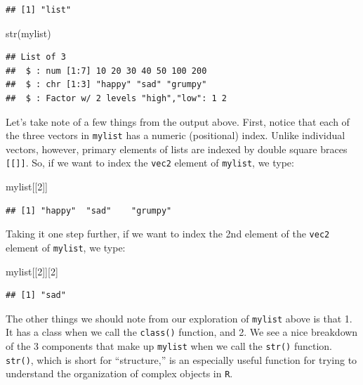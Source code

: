 \documentclass[
]{book}
\newenvironment{Shaded}{\begin{snugshade}}{\end{snugshade}}
\newcommand{\DecValTok}[1]{\textcolor[rgb]{0.00,0.00,0.81}{#1}}
\newcommand{\FunctionTok}[1]{\textcolor[rgb]{0.00,0.00,0.00}{#1}}
\newcommand{\NormalTok}[1]{#1}
\begin{document}
\begin{verbatim}
## [1] "list"
\end{verbatim}

\begin{Shaded}
\begin{Highlighting}[]
\FunctionTok{str}\NormalTok{(mylist)}
\end{Highlighting}
\end{Shaded}

\begin{verbatim}
## List of 3
##  $ : num [1:7] 10 20 30 40 50 100 200
##  $ : chr [1:3] "happy" "sad" "grumpy"
##  $ : Factor w/ 2 levels "high","low": 1 2
\end{verbatim}

Let's take note of a few things from the output above. First, notice that each of the three vectors in \texttt{mylist} has a numeric (positional) index. Unlike individual vectors, however, primary elements of lists are indexed by double square braces \texttt{{[}{[}{]}{]}}. So, if we want to index the \texttt{vec2} element of \texttt{mylist}, we type:

\begin{Shaded}
\begin{Highlighting}[]
\NormalTok{mylist[[}\DecValTok{2}\NormalTok{]]}
\end{Highlighting}
\end{Shaded}

\begin{verbatim}
## [1] "happy"  "sad"    "grumpy"
\end{verbatim}

Taking it one step further, if we want to index the 2nd element of the \texttt{vec2} element of \texttt{mylist}, we type:

\begin{Shaded}
\begin{Highlighting}[]
\NormalTok{mylist[[}\DecValTok{2}\NormalTok{]][}\DecValTok{2}\NormalTok{]}
\end{Highlighting}
\end{Shaded}

\begin{verbatim}
## [1] "sad"
\end{verbatim}

The other things we should note from our exploration of \texttt{mylist} above is that 1. It has a class when we call the \texttt{class()} function, and 2. We see a nice breakdown of the 3 components that make up \texttt{mylist} when we call the \texttt{str()} function. \texttt{str()}, which is short for ``structure,'' is an especially useful function for trying to understand the organization of complex objects in \texttt{R}.
\end{document}
